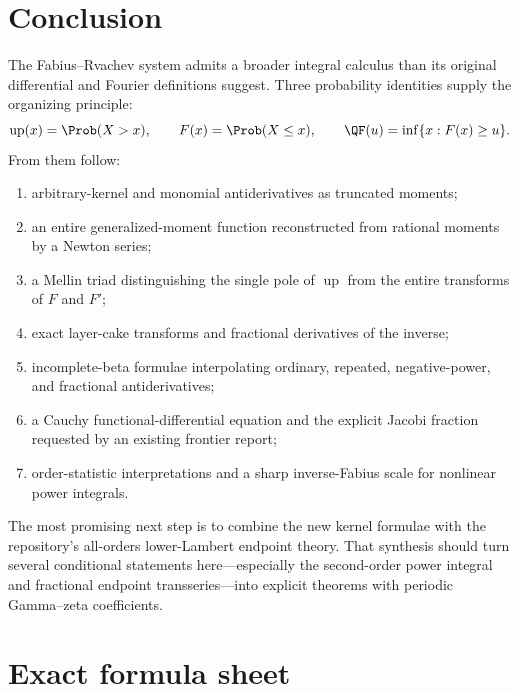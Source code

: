 \documentclass[11pt,oneside]{article}
\theoremstyle{definition}
\theoremstyle{remark}
\newcommand{\Up}{\operatorname{up}}
\newcommand{\1}{\mathbf 1}
\begin{document}
\section{Conclusion}
\label{p8:sec:conclusion}

The Fabius--Rvachev system admits a broader integral calculus than its original
differential and Fourier definitions suggest.  Three probability identities
supply the organizing principle:
\begin{equation}
 \Up(x)=\Prob(X>x),
 \qquad
 F(x)=\Prob(X\le x),
 \qquad
 \QF(u)=\inf\{x:F(x)\ge u\}.
 \label{p8:eq:three-probability-objects}
\end{equation}
From them follow:
\begin{enumerate}
\item arbitrary-kernel and monomial antiderivatives as truncated moments;
\item an entire generalized-moment function reconstructed from rational moments
      by a Newton series;
\item a Mellin triad distinguishing the single pole of \(\Up\) from the entire
      transforms of \(F\) and \(F'\);
\item exact layer-cake transforms and fractional derivatives of the inverse;
\item incomplete-beta formulae interpolating ordinary, repeated, negative-power,
      and fractional antiderivatives;
\item a Cauchy functional-differential equation and the explicit Jacobi fraction
      requested by an existing frontier report;
\item order-statistic interpretations and a sharp inverse-Fabius scale for
      nonlinear power integrals.
\end{enumerate}

The most promising next step is to combine the new kernel formulae with the
repository's all-orders lower-Lambert endpoint theory.  That synthesis should
turn several conditional statements here---especially the second-order power
integral and fractional endpoint transseries---into explicit theorems with
periodic Gamma--zeta coefficients.

\appendix

\section{Exact formula sheet}
\label{p8:app:formula-sheet}
\end{document}
